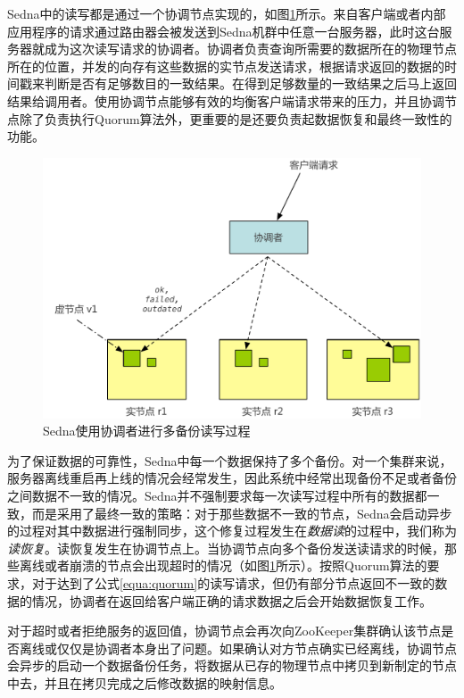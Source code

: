 Sedna中的读写都是通过一个协调节点实现的，如图\ref{fig:sednareplicas}所示。来自客户端或者内部应用程序的请求通过路由器会被发送到Sedna机群中任意一台服务器，此时这台服务器就成为这次读写请求的协调者。协调者负责查询所需要的数据所在的物理节点所在的位置，并发的向存有这些数据的实节点发送请求，根据请求返回的数据的时间戳来判断是否有足够数目的一致结果。在得到足够数量的一致结果之后马上返回结果给调用者。使用协调节点能够有效的均衡客户端请求带来的压力，并且协调节点除了负责执行Quorum算法外，更重要的是还要负责起数据恢复和最终一致性的功能。

\begin{figure}[h!]
\centering
\includegraphics[width=5in]{../figures/sednareplicas.pdf}
\caption{Sedna使用协调者进行多备份读写过程}
\label{fig:sednareplicas}
\end{figure}

为了保证数据的可靠性，Sedna中每一个数据保持了多个备份。对一个集群来说，服务器离线重启再上线的情况会经常发生，因此系统中经常出现备份不足或者备份之间数据不一致的情况。Sedna并不强制要求每一次读写过程中所有的数据都一致，而是采用了最终一致的策略：对于那些数据不一致的节点，Sedna会启动异步的过程对其中数据进行强制同步，这个修复过程发生在\textit{数据读}的过程中，我们称为\textit{读恢复}。读恢复发生在协调节点上。当协调节点向多个备份发送读请求的时候，那些离线或者崩溃的节点会出现超时的情况（如图\ref{fig:sednareplicas}所示）。按照Quorum算法的要求，对于达到了公式\ref{equa:quorum}的读写请求，但仍有部分节点返回不一致的数据的情况，协调者在返回给客户端正确的请求数据之后会开始数据恢复工作。

对于超时或者拒绝服务的返回值，协调节点会再次向ZooKeeper集群确认该节点是否离线或仅仅是协调者本身出了问题。如果确认对方节点确实已经离线，协调节点会异步的启动一个数据备份任务，将数据从已存的物理节点中拷贝到新制定的节点中去，并且在拷贝完成之后修改数据的映射信息。

